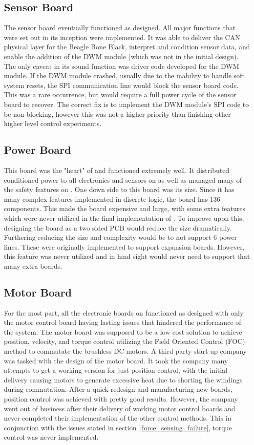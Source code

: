 \begin{appendices}
\subsection{Sensor Board}
The sensor board eventually functioned as designed.
All major functions that were set out in its inception were implemented.
It was able to deliver the CAN physical layer for the Beagle Bone Black, interpret and condition sensor data, and enable the addition of the DWM module (which was not in the initial design).
The only caveat in its sound function was driver code developed for the DWM module.
If the DWM module crashed, usually due to the inability to handle soft system resets, the SPI communication line would block the sensor board code.
This was a rare occurrence, but would require a full power cycle of the sensor board to recover.
The correct fix is to implement the DWM module's SPI code to be non-blocking, however this was not a higher priority than finishing other higher level control experiments.

\subsection{Power Board}
This board was the "heart" of \SB{} and functioned extremely well.
It distributed conditioned power to all electronics and sensors on \SB{} as well as managed many of the safety features on \SB{}.
One down side to this board was its size.
Since it has many complex features implemented in discrete logic, the board has 136 components.
This made the board expensive and large, with some extra features which were never utilized in the final implementation of \SB{}.
To improve upon this, designing the board as a two sided PCB would reduce the size dramatically.
Furthering reducing the size and complexity would be to not support 6 power lines.
These were originally implemented to support expansion boards.
However, this feature was never utilized and in hind sight would never need to support that many extra boards.

\subsection{Motor Board}
For the most part, all the electronic boards on \SB{} functioned as designed with only the motor control board having lasting issues that hindered the performance of the system.
The motor board was supposed to be a low cost solution to achieve position, velocity, and torque control utilizing the Field Oriented Control (FOC) method to commutate the brushless DC motors.
A third party start-up company was tasked with the design of the motor board.
It took the company many attempts to get a working version for just position control, with the initial delivery causing motors to generate excessive heat due to shorting the windings during commutation.
After a quick redesign and manufacturing new boards, position control was achieved with pretty good results.
However, the company went out of business after their delivery of working motor control boards and never completed their implementation of the other control methods.
This in conjunction with the issues stated in section~\ref{force_sensing_failure}, torque control was never implemented.


\end{appendices}
